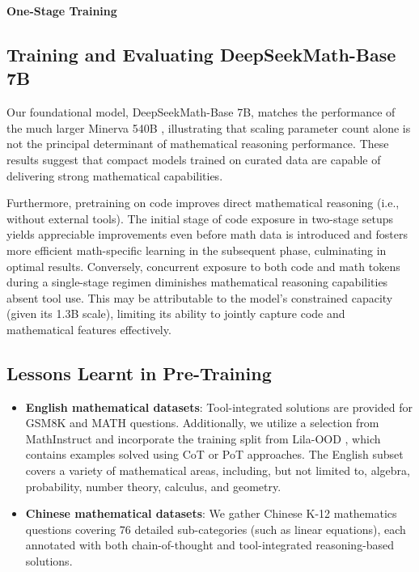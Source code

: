 \textbf{One-Stage Training}

\subsection{Training and Evaluating DeepSeekMath-Base 7B}

    \item Our foundational model, DeepSeekMath-Base 7B, matches the performance of the much larger Minerva 540B \citep{minerva}, illustrating that scaling parameter count alone is not the principal determinant of mathematical reasoning performance. These results suggest that compact models trained on curated data are capable of delivering strong mathematical capabilities.

Furthermore, pretraining on code improves direct mathematical reasoning (i.e., without external tools). The initial stage of code exposure in two-stage setups yields appreciable improvements even before math data is introduced and fosters more efficient math-specific learning in the subsequent phase, culminating in optimal results. Conversely, concurrent exposure to both code and math tokens during a single-stage regimen diminishes mathematical reasoning capabilities absent tool use. This may be attributable to the model’s constrained capacity (given its 1.3B scale), limiting its ability to jointly capture code and mathematical features effectively.

\subsection{Lessons Learnt in Pre-Training}

\begin{itemize}[topsep=0pt]
    \item \textbf{English mathematical datasets}: Tool-integrated solutions are provided for GSM8K and MATH questions. Additionally, we utilize a selection from MathInstruct \citep{MathInstruct} and incorporate the training split from Lila-OOD \citep{lila}, which contains examples solved using CoT or PoT approaches. The English subset covers a variety of mathematical areas, including, but not limited to, algebra, probability, number theory, calculus, and geometry.
    \item \textbf{Chinese mathematical datasets}: We gather Chinese K-12 mathematics questions covering 76 detailed sub-categories (such as linear equations), each annotated with both chain-of-thought and tool-integrated reasoning-based solutions.
\end{itemize}

